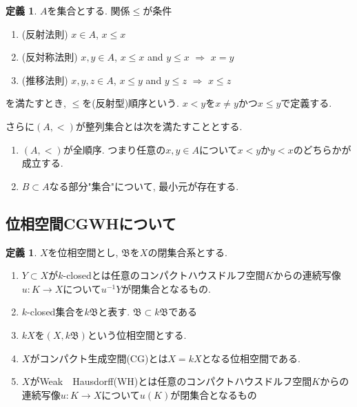 \documentclass[dvipdfmx,a4paper,11pt]{report}
\theoremstyle{definition}
\newtheorem{dfn}[thm]{定義}
\begin{document}
\begin{tcolorbox}[colback = white, colframe = green!35!black, fonttitle = \bfseries,breakable = true]
 \begin{dfn}
 $A$を集合とする. 関係$\le$が条件
 \begin{enumerate}
 \item (反射法則) $x \in A$, $x \le x$
 \item (反対称法則) $x,y \in A$, $x \le x$ and $y \le x$ $\Rightarrow$ $x=y$
 \item (推移法則) $x,y, z\in A$, $x \le y$ and $y \le z$ $\Rightarrow$ $x\le z$
 \end{enumerate}
を満たすとき, $\le$を(反射型)順序という.
$x< y$を$x \neq y$かつ$x \le y$で定義する. 

さらに$(A,<)$が整列集合とは次を満たすこととする. 
 \begin{enumerate}
 \item  $(A,<)$が全順序. つまり任意の$x, y \in A$について$x <y$か$y < x$のどちらかが成立する.
 \item $B \subset A$なる部分"集合"について, 最小元が存在する. 
 \end{enumerate}
\end{dfn}
 \end{tcolorbox}

\subsection{位相空間CGWHについて}
\label{subsec-CGWH}
\begin{tcolorbox}
 [colback = white, colframe = green!35!black, fonttitle = \bfseries,breakable = true]
\begin{dfn}\cite[Definition 1.1 ,1.2]{Str}
$X$を位相空間とし, $\mathfrak{B}$を$X$の閉集合系とする. 
\begin{enumerate}
\item $Y \subset X$が$k$-closedとは任意のコンパクトハウスドルフ空間$K$からの連続写像$u : K \to X$について$u^{-1}Y$が閉集合となるもの. 
\item $k$-closed集合を$k\mathfrak{B}$と表す. $\mathfrak{B} \subset k \mathfrak{B}$である
\item $kX$を$(X, k\mathfrak{B})$という位相空間とする. 
\item $X$がコンパクト生成空間(CG)とは$X = kX$となる位相空間である.
\item $X$がWeak　Hausdorff(WH)とは任意のコンパクトハウスドルフ空間$K$からの連続写像$u : K \to X$について$u(K)$が閉集合となるもの
\end{enumerate}
\end{dfn}
\end{tcolorbox}
\end{document}
